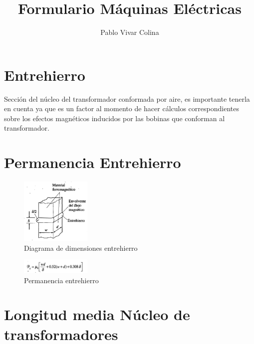 \documentclass[]{article}
\title{Formulario Máquinas Eléctricas}
\author{Pablo Vivar Colina}
\begin{document}
	

\maketitle




\section{Entrehierro}

Sección del núcleo del transformador conformada por aire, es importante tenerla en cuenta ya que es un factor al momento de hacer cálculos correspondientes sobre los efectos magnéticos inducidos por las bobinas que conforman al transformador.\\

\section{Permanencia Entrehierro}

\begin{figure}[h!]
	\centering
	\includegraphics[width=0.3\textwidth]{EntreHierro}
	\caption{Diagrama de dimensiones entrehierro}
	\label{Entrehierro}
\end{figure}

\begin{figure}[h!]
	\centering
	\includegraphics[width=0.3\textwidth]{PermanenciaEntrehierro}
    \caption{Permanencia entrehierro}
    \label{permEntrehierro}
\end{figure}

\section{Longitud media Núcleo de transformadores}
\end{document}

